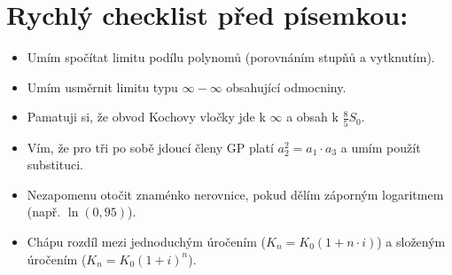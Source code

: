 \documentclass[12pt,a4paper]{article}
\begin{document}
\section{Rychlý checklist před písemkou:}
\begin{itemize}[label=$\square$]
    \item Umím spočítat limitu podílu polynomů (porovnáním stupňů a vytknutím).
    \item Umím usměrnit limitu typu $\infty - \infty$ obsahující odmocniny.
    \item Pamatuji si, že obvod Kochovy vločky jde k $\infty$ a obsah k $\frac{8}{5} S_0$.
    \item Vím, že pro tři po sobě jdoucí členy GP platí $a_2^2 = a_1 \cdot a_3$ a umím použít substituci.
    \item Nezapomenu otočit znaménko nerovnice, pokud dělím záporným logaritmem (např. $\ln(0{,}95)$).
    \item Chápu rozdíl mezi jednoduchým úročením ($K_n = K_0(1+n \cdot i)$) a složeným úročením ($K_n = K_0(1+i)^n$).
\end{itemize}
\end{document}
